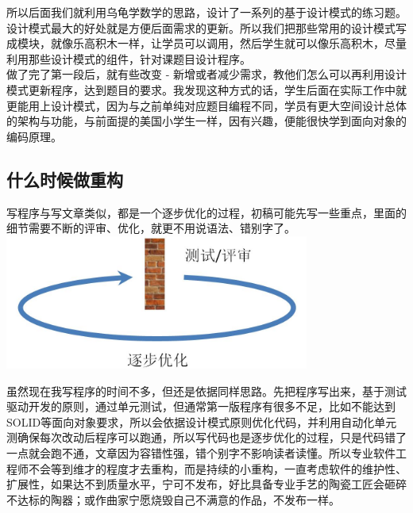 所以后面我们就利用乌龟学数学的思路，设计了一系列的基于设计模式的练习题。设计模式最大的好处就是方便后面需求的更新。所以我们把那些常用的设计模式写成模块，就像乐高积木一样，让学员可以调用，然后学生就可以像乐高积木，尽量利用那些设计模式的组件，针对课题目设计程序。\\
做了完了第一段后，就有些改变 -
新增或者减少需求，教他们怎么可以再利用设计模式更新程序，达到题目的要求。我发现这种方式的话，学生后面在实际工作中就更能用上设计模式，因为与之前单纯对应题目编程不同，学员有更大空间设计总体的架构与功能，与前面提的美国小学生一样，因有兴趣，便能很快学到面向对象的编码原理。\\

\hypertarget{ux4ec0ux4e48ux65f6ux5019ux505aux91cdux6784}{%
\subsection{什么时候做重构}\label{ux4ec0ux4e48ux65f6ux5019ux505aux91cdux6784}}

写程序与写文章类似，都是一个逐步优化的过程，初稿可能先写一些重点，里面的细节需要不断的评审、优化，就更不用说语法、错别字了。\\

\includegraphics[width=10cm]{环形图1.jpg}

虽然现在我写程序的时间不多，但还是依据同样思路。先把程序写出来，基于测试驱动开发的原则，通过单元测试，但通常第一版程序有很多不足，比如不能达到SOLID等面向对象要求，所以会依据设计模式原则优化代码，并利用自动化单元测确保每次改动后程序可以跑通，所以写代码也是逐步优化的过程，只是代码错了一点就会跑不通，文章因为容错性强，错个别字不影响读者读懂。所以专业软件工程师不会等到维才的程度才去重构，而是持续的小重构，一直考虑软件的维护性、扩展性，如果达不到质量水平，宁可不发布，好比具备专业手艺的陶瓷工匠会砸碎不达标的陶器；或作曲家宁愿烧毁自己不满意的作品，不发布一样。

